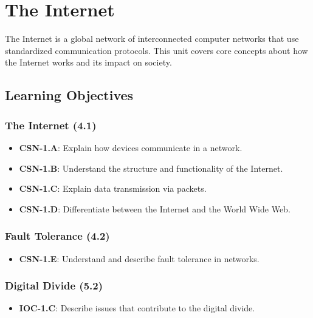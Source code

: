 \chapter{The Internet}

The Internet is a global network of interconnected computer networks that use standardized communication protocols. This unit covers core concepts about how the Internet works and its impact on society.


\section*{Learning Objectives}

\subsection*{The Internet (4.1)}
\begin{itemize}[label=--]
    \item \textbf{CSN-1.A}: Explain how devices communicate in a network. %
    \item \textbf{CSN-1.B}: Understand the structure and functionality of the Internet. %
    \item \textbf{CSN-1.C}: Explain data transmission via packets. %
    \item \textbf{CSN-1.D}: Differentiate between the Internet and the World Wide Web. %
\end{itemize}

\subsection*{Fault Tolerance (4.2)}
\begin{itemize}[label=--]
    \item \textbf{CSN-1.E}: Understand and describe fault tolerance in networks. %
\end{itemize}

\subsection*{Digital Divide (5.2)}
\begin{itemize}[label=--]
    \item \textbf{IOC-1.C}: Describe issues that contribute to the digital divide. %
\end{itemize}

